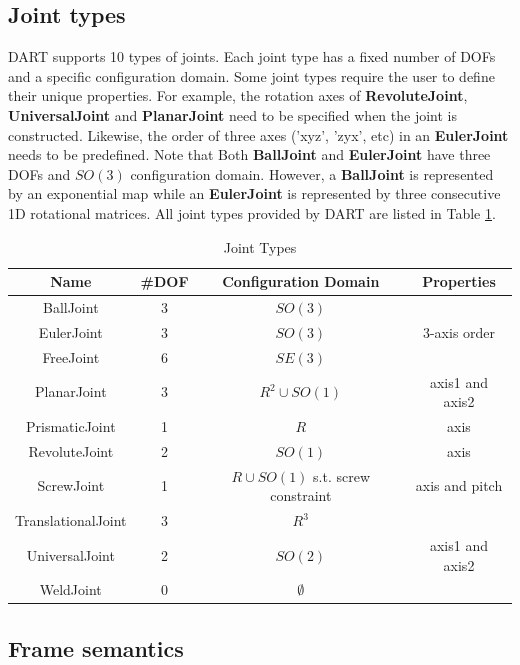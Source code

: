 \subsection{Joint types}
\label{sec:jointTypes}
DART supports 10 types of joints. Each joint type has a fixed number of DOFs and a specific configuration domain. Some joint types require the user to define their unique properties. For example, the rotation axes of \textbf{RevoluteJoint}, \textbf{UniversalJoint} and \textbf{PlanarJoint} need to be specified when the joint is constructed. Likewise, the order of three axes ('xyz', 'zyx', etc) in an \textbf{EulerJoint} needs to be predefined. Note that Both \textbf{BallJoint} and \textbf{EulerJoint} have three DOFs and $SO(3)$ configuration domain. However, a \textbf{BallJoint} is represented by an exponential map while an \textbf{EulerJoint} is represented by three consecutive 1D rotational matrices. All joint types provided by DART are listed in Table \ref{tab:jointTypes}. 

\begin{table}[h]
\centering
\caption{Joint Types}
\begin{tabular}{|c|c|c|c|}
  \hline
  \textbf{Name} & \textbf{\#DOF} & \textbf{Configuration Domain}  & \textbf{Properties}\\
  \hline
  BallJoint  &  3 & $SO(3)$  & \\
  \hline
  EulerJoint & 3  & $SO(3)$ & 3-axis order \\
  \hline
  FreeJoint  & 6 & $SE(3)$  &\\
  \hline
  PlanarJoint & 3  & $R^2 \cup SO(1)$ & axis1 and axis2 \\
  \hline
  PrismaticJoint & 1  & $R$ & axis \\
  \hline
  RevoluteJoint & 2  & $SO(1)$ & axis \\
  \hline
  ScrewJoint & 1  & $R \cup SO(1)$  s.t. screw constraint & axis and pitch \\
  \hline
  TranslationalJoint & 3  & $R^3$ &  \\
  \hline
  UniversalJoint & 2  & $SO(2)$ & axis1 and axis2 \\
  \hline
  WeldJoint & 0  & $\emptyset$ &  \\
  \hline
\end{tabular}
\label{tab:jointTypes}
\end{table}

\subsection{Frame semantics}

